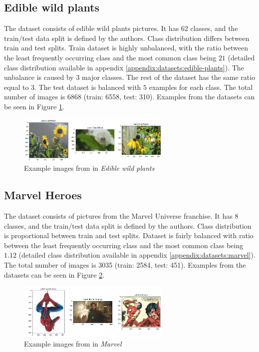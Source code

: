 \subsection{Edible wild plants}

The dataset consists of edible wild plants pictures. It has 62 classes, and the train/test data split is defined by the authors. Class distribution differs between train and test splits. Train dataset is highly unbalanced, with the ratio between the least frequently occurring class and the most common class being $21$ (detailed class distribution available in appendix \ref{appendix:datasets:edible-plants}). The unbalance is caused by 3 major classes. The rest of the dataset has the same ratio equal to $3$. The test dataset is balanced with $5$ examples for each class. The total number of images is 6868 (train: 6558, test: 310). Examples from the datasets can be seen in Figure \ref{fig:edible-plants-example}.

\begin{figure}[ht]
    \centering
    \includegraphics[width=0.65\textwidth]{experiments/datasets/wild-plants.png}
    \caption{Example images from in \textit{Edible wild plants} \cite{edible-wild-plants}}\label{fig:edible-plants-example}
\end{figure}

\subsection{Marvel Heroes}

The dataset consists of pictures from the Marvel Universe franchise. It has 8 classes, and the train/test data split is defined by the authors. Class distribution is proportional between train and test splits. Dataset is fairly balanced with ratio between the least frequently occurring class and the most common class being $1.12$ (detailed class distribution available in appendix \ref{appendix:datasets:marvel}). The total number of images is 3035 (train: 2584, test: 451). Examples from the datasets can be seen in Figure \ref{fig:marvel-example}.

\begin{figure}[ht]
    \centering
    \includegraphics[width=0.65\textwidth]{experiments/datasets/marvel.png}
    \caption{Example images from in \textit{Marvel} \cite{marvel-heroes}}\label{fig:marvel-example}
\end{figure}

